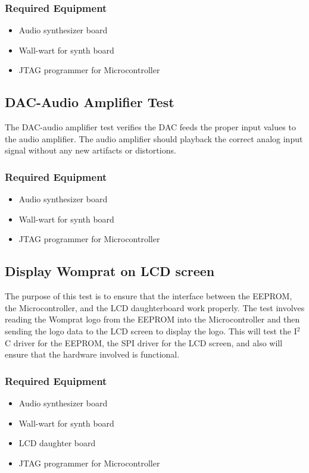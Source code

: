 \documentclass{article}
\begin{document}
\subsubsection{Required Equipment}
\begin{itemize}
\item Audio synthesizer board
\item Wall-wart for synth board
\item JTAG programmer for Microcontroller
\end{itemize}

\subsection{DAC-Audio Amplifier Test}
The DAC-audio amplifier test verifies the DAC feeds the proper input values to the audio amplifier.  The audio amplifier should playback the correct analog input signal without any new artifacts or distortions.
\subsubsection{Required Equipment}
\begin{itemize}
\item Audio synthesizer board
\item Wall-wart for synth board
\item JTAG programmer for Microcontroller
\end{itemize}

\subsection{Display Womprat on LCD screen}
The purpose of this test is to ensure that the interface between the EEPROM, the Microcontroller, and the LCD daughterboard work properly. The test involves reading the Womprat logo from the EEPROM into the Microcontroller and then sending the logo data to the LCD screen to display the logo. This will test the I$^2$C driver for the EEPROM, the SPI driver for the LCD screen, and also will ensure that the hardware involved is functional.
\subsubsection{Required Equipment}
\begin{itemize}
\item Audio synthesizer board
\item Wall-wart for synth board
\item LCD daughter board
\item JTAG programmer for Microcontroller
\end{itemize}
\end{document}
